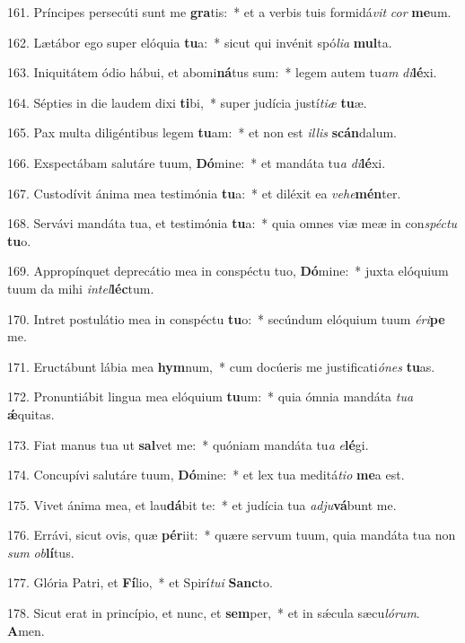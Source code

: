 161. Príncipes persecúti sunt me \textbf{gra}tis:~*  et a verbis tuis formidá\textit{vit} \textit{cor} \textbf{me}um.\

162. Lætábor ego super elóquia \textbf{tu}a:~*  sicut qui invénit spó\textit{li}\textit{a} \textbf{mul}ta.\

163. Iniquitátem ódio hábui, et abomi\textbf{ná}tus sum:~*  legem autem tu\textit{am} \textit{di}\textbf{lé}xi.\

164. Sépties in die laudem dixi \textbf{ti}bi,~*  super judícia justí\textit{ti}\textit{æ} \textbf{tu}æ.\

165. Pax multa diligéntibus legem \textbf{tu}am:~*  et non est \textit{il}\textit{lis} \textbf{scán}dalum.\

166. Exspectábam salutáre tuum, \textbf{Dó}mine:~*  et mandáta tu\textit{a} \textit{di}\textbf{lé}xi.\

167. Custodívit ánima mea testimónia \textbf{tu}a:~*  et diléxit ea \textit{ve}\textit{he}\textbf{mén}ter.\

168. Servávi mandáta tua, et testimónia \textbf{tu}a:~*  quia omnes viæ meæ in con\textit{spéc}\textit{tu} \textbf{tu}o.\

169. Appropínquet deprecátio mea in conspéctu tuo, \textbf{Dó}mine:~*  juxta elóquium tuum da mihi \textit{in}\textit{tel}\textbf{léc}tum.\

170. Intret postulátio mea in conspéctu \textbf{tu}o:~*  secúndum elóquium tuum \textit{é}\textit{ri}\textbf{pe} me.\

171. Eructábunt lábia mea \textbf{hym}num,~*  cum docúeris me justificati\textit{ó}\textit{nes} \textbf{tu}as.\

172. Pronuntiábit lingua mea elóquium \textbf{tu}um:~*  quia ómnia mandáta \textit{tu}\textit{a} \textbf{ǽ}quitas.\

173. Fiat manus tua ut \textbf{sal}vet me:~*  quóniam mandáta tu\textit{a} \textit{e}\textbf{lé}gi.\

174. Concupívi salutáre tuum, \textbf{Dó}mine:~*  et lex tua meditá\textit{ti}\textit{o} \textbf{me}a est.\

175. Vivet ánima mea, et lau\textbf{dá}bit te:~*  et judícia tua \textit{ad}\textit{ju}\textbf{vá}bunt me.\

176. Errávi, sicut ovis, quæ \textbf{pér}iit:~*  quære servum tuum, quia mandáta tua non \textit{sum} \textit{ob}\textbf{lí}tus.\

177. Glória Patri, et \textbf{Fí}lio,~*  et Spirí\textit{tu}\textit{i} \textbf{Sanc}to.\

178. Sicut erat in princípio, et nunc, et \textbf{sem}per,~*  et in sǽcula sæcu\textit{ló}\textit{rum}. \textbf{A}men.\

